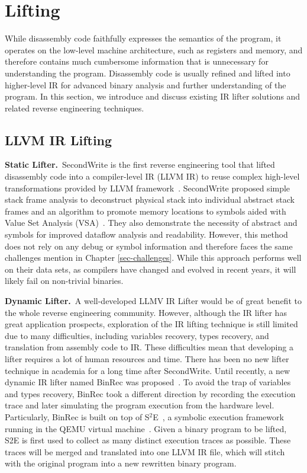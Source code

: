 \section{Lifting} \label{sec:existing-lifting}
While disassembly code faithfully expresses the semantics of the program, it operates on the low-level machine architecture, such as registers and memory, and therefore contains much cumbersome information that is unnecessary for understanding the program. Disassembly code is usually refined and lifted into higher-level IR for advanced binary analysis and further understanding of the program. In this section, we introduce and discuss existing IR lifter solutions and related reverse engineering techniques.

\subsection{LLVM IR Lifting} \label{sec:existing-llvm-lifting}
\noindent\textbf{Static Lifter.}~SecondWrite is the first reverse engineering tool that lifted disassembly code into a compiler-level IR (LLVM IR) to reuse complex high-level transformations provided by LLVM framework~\cite{anand2013compiler,elwazeer2013scalable}.
SecondWrite proposed simple stack frame analysis to deconstruct physical stack into individual abstract stack frames and an algorithm to promote memory locations to symbols aided with Value Set Analysis (VSA)~\cite{balakrishnan2004analyzing}.
They also demonstrate the necessity of abstract and symbols for improved dataflow analysis and readability.
However, this method does not rely on any debug or symbol information and therefore faces the same challenges mention in Chapter \ref{sec-challenges}. While this approach performs well on their data sets, as compilers have changed and evolved in recent years, it will likely fail on non-trivial binaries.

\noindent\textbf{Dynamic Lifter.}~A well-developed LLMV IR Lifter would be of great benefit to the whole reverse engineering community. However, although the IR lifter has great application prospects, exploration of the IR lifting technique is still limited due to many difficulties, including variables recovery, types recovery, and translation from assembly code to IR.
These difficulties mean that developing a lifter requires a lot of human resources and time. There has been no new lifter technique in academia for a long time after SecondWrite. Until recently, a new dynamic IR lifter named BinRec was proposed~\cite{altinay2020binrec}.
To avoid the trap of variables and types recovery, BinRec took a different direction by recording the execution trace and later simulating the program execution from the hardware level.
Particularly, BinRec is built on top of S$^2$E~\cite{chipounov2011s2e}, a symbolic execution framework running in the QEMU virtual machine~\cite{bellard2005qemu}.
Given a binary program to be lifted, S2E is first used to collect as many distinct execution traces as possible. These traces will be merged and translated into one LLVM IR file, which will stitch with the original program into a new rewritten binary program.

